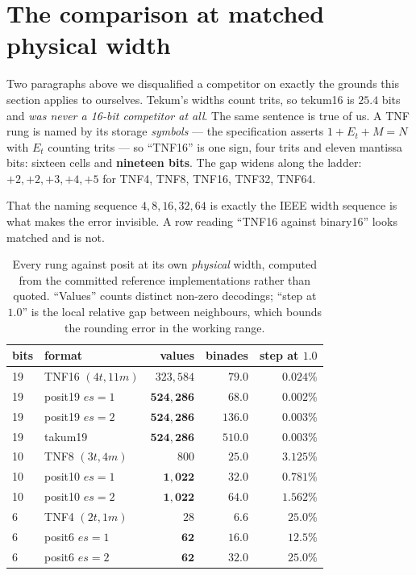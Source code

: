 \documentclass[11pt]{article}
\theoremstyle{definition}
\begin{document}
\section{The comparison at matched physical width}\label{sec:matchedwidth}

Two paragraphs above we disqualified a competitor on exactly the grounds this
section applies to ourselves. Tekum's widths count trits, so tekum16 is
$25.4$ bits and \emph{was never a 16-bit competitor at all}. The same sentence
is true of us. A TNF rung is named by its storage \emph{symbols} --- the
specification asserts $1 + E_t + M = N$ with $E_t$ counting trits --- so
``TNF16'' is one sign, four trits and eleven mantissa bits: sixteen cells and
\textbf{nineteen bits}. The gap widens along the ladder: $+2, +2, +3, +4, +5$
for TNF4, TNF8, TNF16, TNF32, TNF64.

That the naming sequence $4, 8, 16, 32, 64$ is exactly the IEEE width sequence
is what makes the error invisible. A row reading ``TNF16 against binary16''
looks matched and is not.

\begin{table}[t]\centering
\caption{Every rung against posit at its own \emph{physical} width, computed
from the committed reference implementations rather than quoted. ``Values'' counts
distinct non-zero decodings; ``step at $1.0$'' is the local relative gap between
neighbours, which bounds the rounding error in the working range.}
\label{tab:matchedwidth}
\begin{tabular}{llrrr}
\toprule
bits & format & values & binades & step at $1.0$ \\
\midrule
19 & TNF16 $(4t,11m)$ & $323{,}584$          & $79.0$  & $0.024\%$ \\
19 & posit19 $es{=}1$ & $\mathbf{524{,}286}$ & $68.0$  & $\mathbf{0.002\%}$ \\
19 & posit19 $es{=}2$ & $\mathbf{524{,}286}$ & $\mathbf{136.0}$ & $\mathbf{0.003\%}$ \\
19 & takum19          & $\mathbf{524{,}286}$ & $\mathbf{510.0}$ & $\mathbf{0.003\%}$ \\
\midrule
10 & TNF8 $(3t,4m)$   & $800$              & $25.0$ & $3.125\%$ \\
10 & posit10 $es{=}1$ & $\mathbf{1{,}022}$ & $\mathbf{32.0}$ & $\mathbf{0.781\%}$ \\
10 & posit10 $es{=}2$ & $\mathbf{1{,}022}$ & $\mathbf{64.0}$ & $\mathbf{1.562\%}$ \\
\midrule
6  & TNF4 $(2t,1m)$   & $28$          & $6.6$ & $25.0\%$ \\
6  & posit6 $es{=}1$  & $\mathbf{62}$ & $\mathbf{16.0}$ & $\mathbf{12.5\%}$ \\
6  & posit6 $es{=}2$  & $\mathbf{62}$ & $\mathbf{32.0}$ & $25.0\%$ \\
\bottomrule
\end{tabular}
\end{table}
\end{document}
